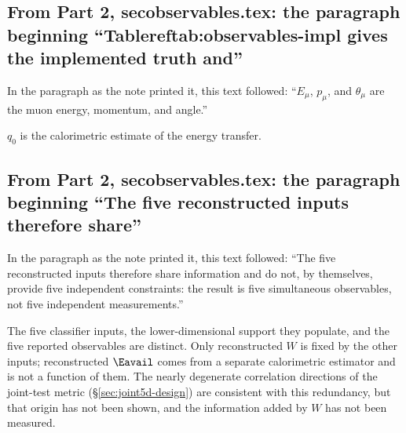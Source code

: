 \subsection{From Part 2, secobservables.tex: the paragraph beginning ``Tablereftab:observables-impl gives the implemented truth and''}
In the paragraph as the note printed it, this text followed: ``$E_{\mu}$, $p_{\mu}$, and $\theta_{\mu}$ are the muon energy, momentum, and angle.''\par
$q_{0}$ is the calorimetric estimate of the energy transfer.

\subsection{From Part 2, secobservables.tex: the paragraph beginning ``The five reconstructed inputs therefore share''}
In the paragraph as the note printed it, this text followed: ``The five reconstructed inputs therefore share information and do not, by themselves, provide five independent constraints: the result is five simultaneous observables, not five independent measurements.''\par
The five classifier inputs, the lower-dimensional support they populate, and the five reported observables are distinct. Only reconstructed $W$ is fixed by the other inputs; reconstructed $\Eavail$ comes from a separate calorimetric estimator and is not a function of them. The nearly degenerate correlation directions of the joint-test metric (\S\ref{sec:joint5d-design}) are consistent with this redundancy, but that origin has not been shown, and the information added by $W$ has not been measured.

